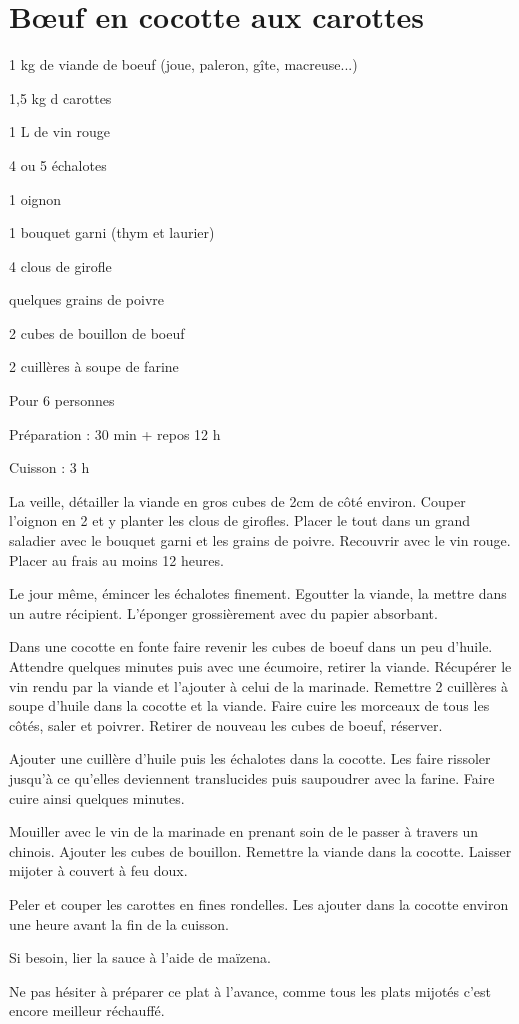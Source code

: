 \section{Bœuf en cocotte aux carottes}

\begin{ingredients}
\item 1 kg de viande de boeuf (joue, paleron, gîte, macreuse...)
\item 1,5 kg d carottes
\item 1 L de vin rouge
\item 4 ou 5 échalotes
\item 1 oignon
\item 1 bouquet garni (thym et laurier)
\item 4 clous de girofle
\item quelques grains de poivre
\item 2 cubes de bouillon de boeuf
\item 2 cuillères à soupe de farine
\end{ingredients}
\begin{infos}
\item Pour 6 personnes		%
\item Préparation : 30 min + repos 12 h		%
\item Cuisson : 3 h			%
\end{infos}
\begin{etapes}
\item La veille, détailler la viande en gros cubes de 2cm de côté environ. Couper l'oignon en 2 et y planter les clous de girofles. Placer le tout dans un grand saladier avec le bouquet garni et les grains de poivre. Recouvrir avec le vin rouge. Placer au frais au moins 12 heures.
\item Le jour même, émincer les échalotes finement. Egoutter la viande, la mettre dans un autre récipient. L'éponger grossièrement avec du papier absorbant. 
\item Dans une cocotte en fonte faire revenir les cubes de boeuf dans un peu d'huile. Attendre quelques minutes puis avec une écumoire, retirer la viande. Récupérer le vin rendu par la viande et l'ajouter à celui de la marinade. Remettre 2 cuillères à soupe d'huile dans la cocotte et la viande. Faire cuire les morceaux de tous les côtés, saler et poivrer. Retirer de nouveau les cubes de boeuf, réserver. 
\item Ajouter une cuillère d'huile puis les échalotes dans la cocotte. Les faire rissoler jusqu'à ce qu'elles deviennent translucides puis saupoudrer avec la farine. Faire cuire ainsi quelques minutes. 
\item Mouiller avec le vin de la marinade en prenant soin de le passer à travers un chinois. Ajouter les cubes de bouillon. Remettre la viande dans la cocotte. Laisser mijoter à couvert à feu doux.
\item Peler et couper les carottes en fines rondelles. Les ajouter dans la cocotte environ une heure avant la fin de la cuisson.
\item Si besoin, lier la sauce à l'aide de maïzena.
\end{etapes}
\begin{conseils}
Ne pas hésiter à préparer ce plat à l'avance, comme tous les plats mijotés c'est encore meilleur réchauffé.
\end{conseils}
